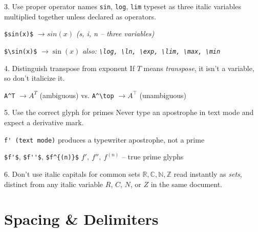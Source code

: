 \documentclass[11pt]{article}
\newcommand{\R}{\mathbb{R}}
\newcommand{\C}{\mathbb{C}}
\newcommand{\N}{\mathbb{N}}
\newcommand{\Z}{\mathbb{Z}}
\begin{document}
\begin{tipbox}{3. Use proper operator names}
\texttt{sin}, \texttt{log}, \texttt{lim} typeset as three italic
variables multiplied together unless declared as operators.
\end{tipbox}

\begin{badcode}
\verb|$sin(x)$| \quad\(\to\)\quad $sin(x)$ \hfill\textit{(s, i, n -- three variables)}
\end{badcode}
\begin{goodcode}
\verb|$\sin(x)$| \quad\(\to\)\quad $\sin(x)$ \hfill\textit{also: \texttt{\textbackslash log, \textbackslash ln, \textbackslash exp, \textbackslash lim, \textbackslash max, \textbackslash min}}
\end{goodcode}

\begin{tipbox}{4. Distinguish transpose from exponent}
If $T$ means \emph{transpose}, it isn't a variable, so don't italicize it.
\end{tipbox}

\begin{center}
\texttt{A\^{}T} $\to A^T$ \quad(ambiguous)
\qquad vs.\qquad
\texttt{A\^{}\textbackslash top} $\to A^\top$ \quad(unambiguous)
\end{center}

\begin{tipbox}{5. Use the correct glyph for primes}
Never type an apostrophe in text mode and expect a derivative mark.
\end{tipbox}

\begin{badcode}
\verb|f' (text mode)| \hfill produces a typewriter apostrophe, not a prime
\end{badcode}
\begin{goodcode}
\verb|$f'$|, \verb|$f''$|, \verb|$f^{(n)}$| \hfill $f',\ f'',\ f^{(n)}$ -- true prime glyphs
\end{goodcode}

\begin{tipbox}{6. Don't use italic capitals for common sets}
$\R,\C,\N,\Z$ read instantly as \emph{sets}, distinct from any italic
variable $R$, $C$, $N$, or $Z$ in the same document.
\end{tipbox}

\section{Spacing \& Delimiters}
\end{document}
